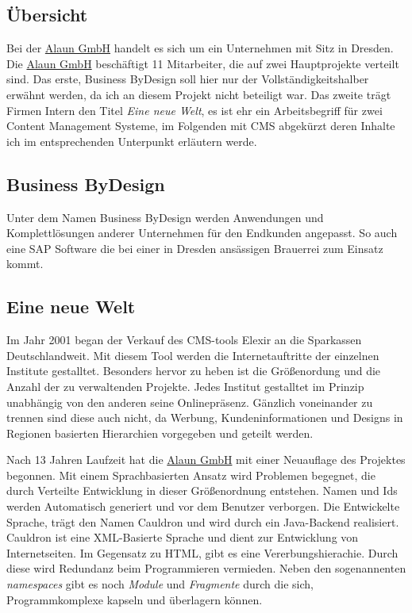 \documentclass{scrartcl}
\begin{document}
\subsection{Übersicht}

Bei der \href{https://alaun.de/home/}{Alaun GmbH} handelt es sich um ein Unternehmen mit Sitz in Dresden.
Die \href{https://alaun.de/home/}{Alaun GmbH} beschäftigt 11 Mitarbeiter, die auf zwei Hauptprojekte verteilt
sind. Das erste, Business ByDesign soll hier nur der Vollständigkeitshalber erwähnt werden, 
da ich an diesem Projekt nicht beteiligt war. Das zweite trägt Firmen Intern den Titel \textit{Eine neue Welt},
es ist ehr ein Arbeitsbegriff für zwei Content Management Systeme, im Folgenden mit CMS abgekürzt deren Inhalte
ich im entsprechenden Unterpunkt erläutern werde.

\subsection{Business ByDesign}

Unter dem Namen Business ByDesign werden Anwendungen und Komplettlösungen anderer Unternehmen für den
Endkunden angepasst. So auch eine SAP Software die bei einer in Dresden ansässigen Brauerrei zum Einsatz kommt.

\subsection{Eine neue Welt}

Im Jahr 2001 began der Verkauf des CMS-tools Elexir an die Sparkassen Deutschlandweit. Mit diesem Tool werden
die Internetauftritte der einzelnen Institute gestalltet. Besonders hervor zu heben ist die Größenordung und
die Anzahl der zu verwaltenden Projekte. Jedes Institut gestalltet im Prinzip unabhängig von den anderen seine Onlinepräsenz.
Gänzlich voneinander zu trennen sind diese auch nicht, da Werbung, Kundeninformationen und Designs in
Regionen basierten Hierarchien vorgegeben und geteilt werden.

Nach 13 Jahren Laufzeit hat die \href{https://alaun.de/home/}{Alaun GmbH} mit einer Neuauflage des Projektes begonnen.
Mit einem Sprachbasierten Ansatz wird Problemen begegnet, die durch Verteilte Entwicklung in dieser Größenordnung
entstehen. Namen und Ids werden Automatisch generiert und vor dem Benutzer verborgen. 
Die Entwickelte Sprache, trägt den Namen Cauldron und wird durch ein Java-Backend realisiert.
Cauldron ist eine XML-Basierte Sprache und dient zur Entwicklung von Internetseiten.
Im Gegensatz zu HTML, gibt es eine Vererbungshierachie. Durch diese wird Redundanz beim Programmieren vermieden.
Neben den sogenannenten \textit{namespaces} gibt es noch \textit{Module} und \textit{Fragmente} durch die sich,
Programmkomplexe kapseln und überlagern können. 
\end{document}
